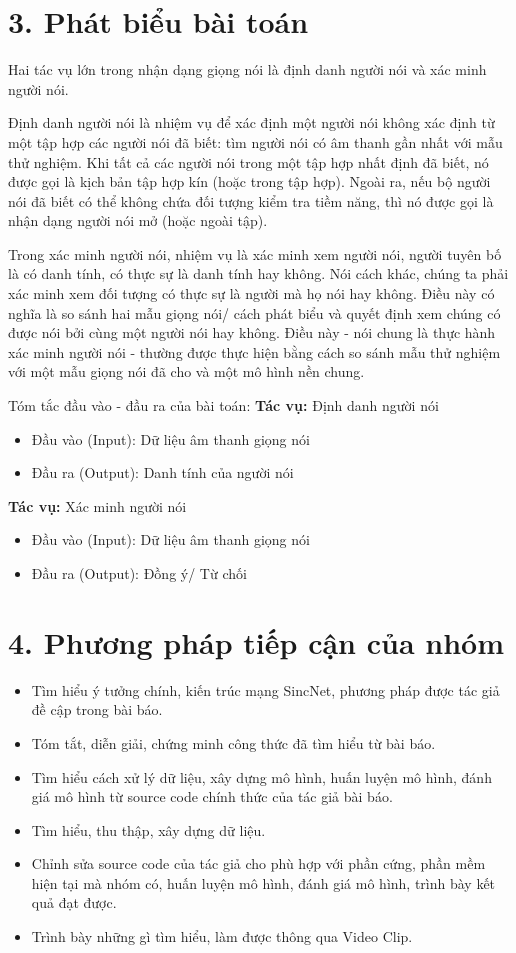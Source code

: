 \documentclass{article}
\begin{document}
	\section{3. Phát biểu bài toán}
	\qquad Hai tác vụ lớn trong nhận dạng giọng nói là định danh người nói và xác minh người nói.
	
	Định danh người nói là nhiệm vụ để xác định một người nói không xác định từ một tập hợp các người nói đã biết: tìm người nói có âm thanh gần nhất với mẫu thử nghiệm. Khi tất cả các người nói trong một tập hợp nhất định đã biết, nó được gọi là kịch bản tập hợp kín (hoặc trong tập hợp). Ngoài ra, nếu bộ người nói đã biết có thể không chứa đối tượng kiểm tra tiềm năng, thì nó được gọi là nhận dạng người nói mở (hoặc ngoài tập).
	
	Trong xác minh người nói, nhiệm vụ là xác minh xem người nói, người tuyên bố là có danh tính, có thực sự là danh tính hay không. Nói cách khác, chúng ta phải xác minh xem đối tượng có thực sự là người mà họ nói hay không. Điều này có nghĩa là so sánh hai mẫu giọng nói/ cách phát biểu và quyết định xem chúng có được nói bởi cùng một người nói hay không. Điều này - nói chung là thực hành xác minh người nói - thường được thực hiện bằng cách so sánh mẫu thử nghiệm với một mẫu giọng nói đã cho và một mô hình nền chung.
	
	\vspace{0.2in}
	Tóm tắc đầu vào - đầu ra của bài toán:\newline
	\textbf{Tác vụ:} Định danh người nói
	\begin{itemize}
		\item Đầu vào (Input): Dữ liệu âm thanh giọng nói
		\item Đầu ra (Output): Danh tính của người nói
	\end{itemize}
	\textbf{Tác vụ:} Xác minh người nói
	\begin{itemize}
		\item Đầu vào (Input): Dữ liệu âm thanh giọng nói
		\item Đầu ra (Output): Đồng ý/ Từ chối
	\end{itemize}
	
	\section{4. Phương pháp tiếp cận của nhóm}
	\begin{itemize}
		\item Tìm hiểu ý tưởng chính, kiến trúc mạng SincNet, phương pháp được tác giả đề cập trong bài báo.
		\item Tóm tắt, diễn giải, chứng minh công thức đã tìm hiểu từ bài báo.
		\item Tìm hiểu cách xử lý dữ liệu, xây dựng mô hình, huấn luyện mô hình, đánh giá mô hình từ source code chính thức của tác giả bài báo.
		\item Tìm hiểu, thu thập, xây dựng dữ liệu.
		\item Chỉnh sửa source code của tác giả cho phù hợp với phần cứng, phần mềm hiện tại mà nhóm có, huấn luyện mô hình, đánh giá mô hình, trình bày kết quả đạt được.
		\item Trình bày những gì tìm hiểu, làm được thông qua Video Clip.
	\end{itemize}
\end{document}
